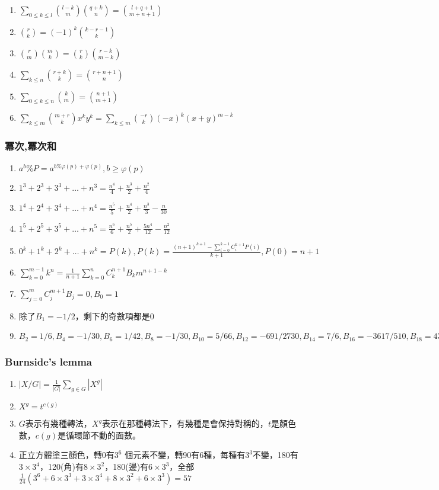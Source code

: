 \begin{enumerate}
\begin{enumerate}
		\item $\sum_{0 \leq k \leq l} \binom{l - k}{m} \binom{q + k}{n} = \binom{l + q + 1}{m + n + 1}$
		\item $\binom{r}{k} = (-1)^k\binom{k - r - 1}{k}$
		\item $\binom{r}{m} \binom{m}{k} = \binom{r}{k} \binom{r - k}{m - k}$
		\item $\sum_{k\leq n} \binom{r + k}{k} = \binom{r + n + 1}{n}$
		\item $\sum_{0\leq k \leq n} \binom{k}{m} = \binom{n + 1}{m + 1}$
		\item $\sum_{k\leq m}\binom{m + r}{k}x^ky^k = \sum_{k\leq m}\binom{-r}{k}(-x)^k (x+y)^{m-k}$	
	\end{enumerate}
\end{enumerate}


\subsubsection{冪次,冪次和}
\begin{enumerate}\itemsep = -3pt
	\item $a^b\%P=a^{b\% \varphi (p)+\varphi (p)},b\geq \varphi (p)$
	\item $1^3+2^3+3^3+\ldots +n^3=\frac{n^4}{4}+\frac{n^3}{2}+\frac{n^2}{4}$
	\item $1^4+2^4+3^4+\ldots +n^4=\frac{n^5}{5}+\frac{n^4}{2}+\frac{n^3}{3}-\frac{n}{30}$
	\item $1^5+2^5+3^5+\ldots +n^5=\frac{n^6}{6}+\frac{n^5}{2}+\frac{5n^4}{12}-\frac{n^2}{12}$
	\item $0^k+1^k+2^k+\ldots +n^k = P(k),P(k)=\frac{(n+1)^{k+1}-\sum_{i=0}^{k-1}C_i^{k+1}P(i)}{k+1},P(0)=n+1$
	\item $\sum_{k=0}^{m-1}k^n=\frac{1}{n+1}\sum_{k=0}^{n}C_k^{n+1}B_km^{n+1-k}$
	\item $\sum_{j=0}^{m}C_j^{m+1}B_j=0,B_0=1$
	\item 除了$B_1=-1/2$，剩下的奇數項都是$0$
	\item $B_2=1/6,B_4=-1/30,B_6=1/42,B_8=-1/30,B_{10}=5/66,B_{12}=-691/2730,B_{14}=7/6,B_{16}=-3617/510,B_{18}=43867/798,B_{20}=-174611/330,$
\end{enumerate}

\subsubsection{Burnside's lemma}
\begin{enumerate}\itemsep = -3pt
	\item $|X/G| = \frac{1}{|G|}\sum_{g \in G}|X^g|$
	\item $X^g=t^{c(g)}$
	\item $G$表示有幾種轉法，$X^g$表示在那種轉法下，有幾種是會保持對稱的，$t$是顏色數，$c(g)$是循環節不動的面數。
	\item 正立方體塗三顏色，轉0有$3^6$ 個元素不變，轉90有6種，每種有$3^3$不變，180有$3\times 3^4$，120(角)有$8\times 3^2$，180(邊)有$6\times 3^3$，全部$\frac{1}{24}\left(3^6+6\times 3^3 + 3 \times 3^4 + 8 \times 3^2 + 6 \times 3^3 \right) = 57$
\end{enumerate}

